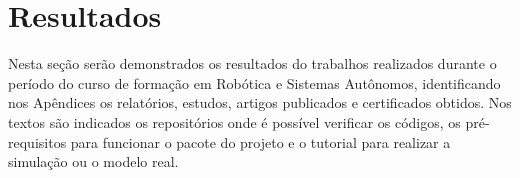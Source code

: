 \chapter{Resultados}
\label{chap:result}
Nesta seção serão demonstrados os resultados do trabalhos realizados durante o período do curso de formação em Robótica e Sistemas Autônomos, identificando nos Apêndices os relatórios, estudos, artigos publicados e certificados obtidos. 
Nos textos são indicados os repositórios onde é possível verificar os códigos, os pré-requisitos para funcionar o pacote do projeto e o tutorial para realizar a simulação ou o modelo real.



